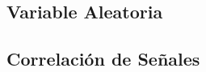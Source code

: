 \subsection{Variable Aleatoria}\label{subs:varaleatoria}

%
%
%
%
\subsection{Correlación de Señales}\label{subs:corresignal}

%
%
%
%

